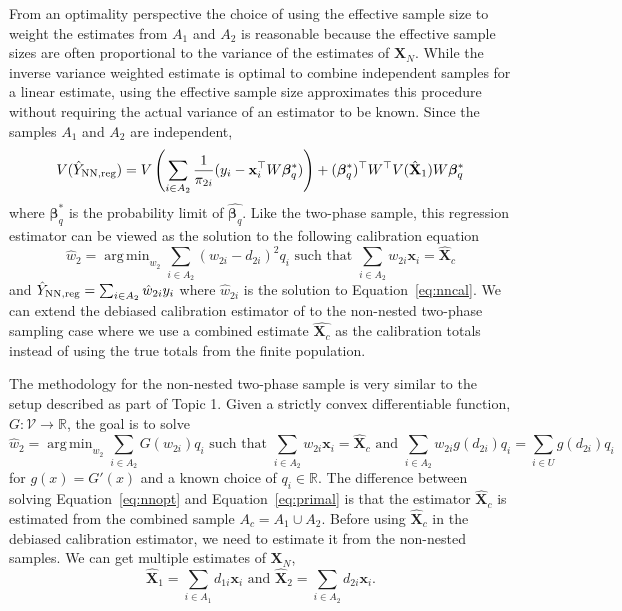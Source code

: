 \documentclass[12pt]{article}
\DeclareMathOperator*{\argmin}{arg\,min}
\renewcommand{\bf}[1]{\mathbf{#1}}
\begin{document}
From an optimality perspective the choice of using the effective sample size to
weight the estimates from $A_1$ and $A_2$ is reasonable because the
effective sample sizes are often proportional to the variance of the estimates 
of $\bf X_N$. While the inverse variance weighted estimate is optimal
to combine independent samples for a linear estimate, using the effective sample
size approximates this procedure without requiring the actual variance of an
estimator to be known. Since the samples $A_1$ and $A_2$ are independent, 
$$
V(\hat Y_{\rm NN, reg}) = 
V\left(\sum_{i \in A_2} \frac{1}{\pi_{2i}}(y_i - \bf x_i^\top W\bm \beta^*_q)\right)
+ (\bm \beta^*_q)^\top W^\top V(\hat{\bf X}_1) W \bm \beta_q^*
$$
where $\bm \beta_q^*$ is the probability limit of $\hat{\bm \beta_q}$. Like the
two-phase sample, this regression estimator can be viewed as the solution to the
following calibration equation 
\begin{equation}\label{eq:nncal}
  \hat w_2 = \argmin_{w_2} \sum_{i \in A_2} (w_{2i} - d_{2i})^2 q_i 
  \text{ such that } \sum_{i \in A_2} w_{2i} \bf x_i = \hat{\bf X}_c
\end{equation}
and $\hat Y_{\rm NN, reg} = \sum_{i \in A_2} \hat w_{2i} y_i$ where $\hat
w_{2i}$ is the solution to Equation~\ref{eq:nncal}.
We can extend the debiased calibration estimator of \cite{kwon2024debiased} to
the non-nested two-phase sampling case where we use a combined estimate
$\hat{\bm X_c}$ as the calibration totals instead of using the true totals from
the finite population.


The methodology for the non-nested two-phase sample is very similar to the setup
described as part of Topic 1. Given a strictly convex differentiable function,
$G: \mathcal{V} \to \mathbb{R}$, the goal is to solve
\begin{equation}\label{eq:nnopt}
\hat w_2 = \argmin_{w_2} \sum_{i \in A_2} G\left(w_{2i}\right) q_i 
\text{ such that } 
\sum_{i \in A_2} w_{2i} \bf x_i = \hat{\bf X}_{c} \text{ and } 
\sum_{i \in A_2} w_{2i} g(d_{2i}) q_i = \sum_{i \in U} g(d_{2i}) q_i
\end{equation}
for $g(x) = G'(x)$ and a known choice of $q_i \in \mathbb{R}$. 
The difference
between solving Equation~\ref{eq:nnopt} and Equation~\ref{eq:primal} is that the
estimator $\hat{\bf X}_c$ is estimated from the combined sample $A_c = A_1 \cup
A_2$. Before using $\hat{\bf X}_c$ in the debiased calibration estimator, we
need to estimate it from the non-nested samples. We can get multiple estimates
of $\bf X_N$, 
$$
\hat{\bf X}_1 = \sum_{i \in A_1} d_{1i} \bf x_i \text{ and }
\hat{\bf X}_2 = \sum_{i \in A_2} d_{2i} \bf x_i.
$$
\end{document}
